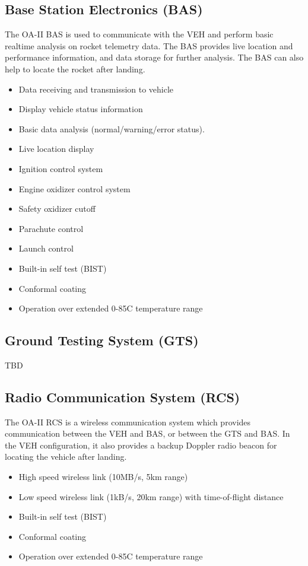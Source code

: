 \documentclass[12pt,article]{memoir}
\begin{document}
\subsection{Base Station Electronics (BAS)}
The OA-II BAS is used to communicate with the VEH and perform basic realtime analysis on rocket telemetry data. The BAS provides live location and performance information, and data storage for further analysis. The BAS can also help to locate the rocket after landing.
\begin{itemize}
	\item Data receiving and transmission to vehicle
	\item Display vehicle status information 
	\item Basic data analysis (normal/warning/error status).
	\item Live location display
	\item Ignition control system
	\item Engine oxidizer control system
	\item Safety oxidizer cutoff
	\item Parachute control
	\item Launch control
	\item Built-in self test (BIST)
	\item Conformal coating
	\item Operation over extended 0-85\degree C temperature range
\end{itemize}

\subsection{Ground Testing System (GTS)}
TBD

\subsection{Radio Communication System (RCS)}
The OA-II RCS is a wireless communication system which provides communication between the VEH and BAS, or between the GTS and BAS. In the VEH configuration, it also provides a backup Doppler radio beacon for locating the vehicle after landing.
\begin{itemize}
	\item High speed wireless link (10MB/s, 5km range)
	\item Low speed wireless link (1kB/s, 20km range) with time-of-flight distance
	\item Built-in self test (BIST)
	\item Conformal coating
	\item Operation over extended 0-85\degree C temperature range
\end{itemize}

\end{document}
